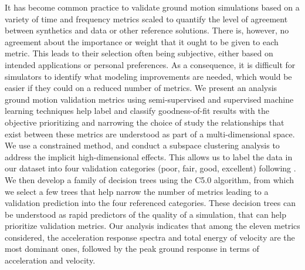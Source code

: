 %
It has become common practice to validate ground motion simulations based on a variety of time and frequency metrics scaled to quantify the level of agreement between synthetics and data or other reference solutions. There is, however, no agreement about the importance or weight that it ought to be given to each metric. This leads to their selection often being subjective, either based on intended applications or personal preferences. As a consequence, it is difficult for simulators to identify what modeling improvements are needed, which would be easier if they could  on a reduced number of metrics. We present an analysis  ground motion validation metrics using semi-supervised and supervised machine learning techniques help label and classify goodness-of-fit results with the objective  prioritizing and narrowing the choice of  study the relationships that exist between  these metrics are understood as part of a multi-dimensional space. We use a constrained \kmeans{} method, and conduct a subspace clustering analysis to address the implicit high-dimensional effects. This allows us to label the data in our dataset into four validation categories (poor, fair, good, excellent) following . We then develop a family of decision trees using the C5.0 algorithm, from which we select a few trees that help narrow the number of metrics leading to a validation prediction into the four referenced categories. These decision trees can be understood as rapid predictors of the quality of a simulation,  that can help prioritize validation metrics. Our analysis indicates that among the eleven metrics considered, the acceleration response spectra and total energy of velocity are the most dominant ones, followed by the peak ground response in terms of acceleration and velocity.

